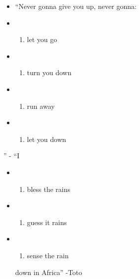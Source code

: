 \documentclass[
  letterpaper,
  DIV=11,
  numbers=noendperiod]{scrreprt}
\providecommand{\tightlist}{%
  \setlength{\itemsep}{0pt}\setlength{\parskip}{0pt}}\usepackage{longtable,booktabs,array}
\begin{document}
\begin{itemize}
\item
  ``Never gonna give you up, never gonna:
\item
  \begin{enumerate}
  \def\labelenumi{(\Alph{enumi})}
  \tightlist
  \item
    let you go\\
  \end{enumerate}
\item
  \begin{enumerate}
  \def\labelenumi{(\Alph{enumi})}
  \setcounter{enumi}{1}
  \tightlist
  \item
    turn you down\\
  \end{enumerate}
\item
  \begin{enumerate}
  \def\labelenumi{(\Alph{enumi})}
  \setcounter{enumi}{2}
  \tightlist
  \item
    run away\\
  \end{enumerate}
\item
  \begin{enumerate}
  \def\labelenumi{(\Alph{enumi})}
  \setcounter{enumi}{3}
  \tightlist
  \item
    let you down
  \end{enumerate}
\end{itemize}

'' - ``I

\begin{itemize}
\item
  \begin{enumerate}
  \def\labelenumi{(\Alph{enumi})}
  \tightlist
  \item
    bless the rains\\
  \end{enumerate}
\item
  \begin{enumerate}
  \def\labelenumi{(\Alph{enumi})}
  \setcounter{enumi}{1}
  \tightlist
  \item
    guess it rains\\
  \end{enumerate}
\item
  \begin{enumerate}
  \def\labelenumi{(\Alph{enumi})}
  \setcounter{enumi}{2}
  \tightlist
  \item
    sense the rain
  \end{enumerate}

  down in Africa'' -Toto
\end{itemize}
\end{document}
